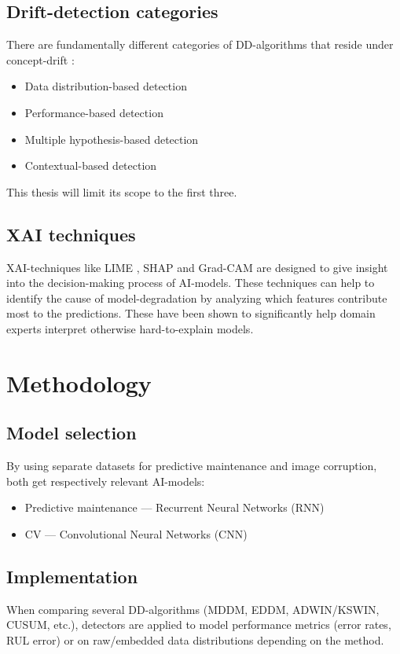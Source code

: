 \subsection{Drift-detection categories}
There are fundamentally different categories of DD-algorithms that reside under concept-drift \autocite{Bayram2022}:
\begin{itemize}
        \item Data distribution-based detection
        \item Performance-based detection
        \item Multiple hypothesis-based detection
        \item Contextual-based detection
\end{itemize}
This thesis will limit its scope to the first three.

\subsection{XAI techniques}
XAI-techniques like LIME \autocite{garreau2020explaining}, SHAP \autocite{VandenBroeck2022} and Grad-CAM \autocite{Selvaraju2017} are designed to give insight into the decision-making process of AI-models. These techniques can help to identify the cause of model-degradation by analyzing which features contribute most to the predictions.
These have been shown to significantly help domain experts interpret otherwise hard-to-explain models.


\section{Methodology}
\label{sec:methodology}

\subsection{Model selection}
By using separate datasets for predictive maintenance and image corruption, both get respectively relevant AI-models:
\begin{itemize}
        \item Predictive maintenance --- Recurrent Neural Networks (RNN)
        \item CV --- Convolutional Neural Networks (CNN)
\end{itemize}

\subsection{Implementation}
When comparing several DD-algorithms (MDDM, EDDM, ADWIN/KSWIN, CUSUM, etc.), detectors are applied to model performance metrics (error rates, RUL error) or on raw/embedded data distributions depending on the method.

